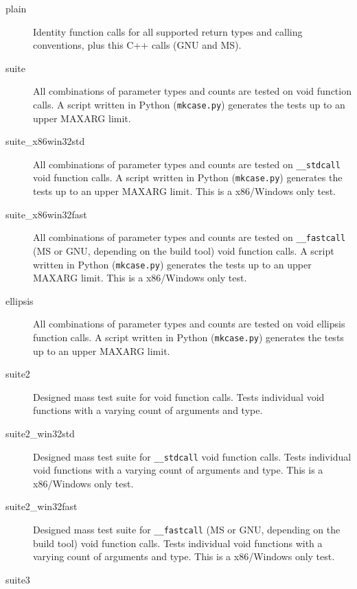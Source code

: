 \begin{description}

\item [plain] 
Identity function calls for all supported return types and calling conventions,
plus this C++ calls (GNU and MS).

\item [suite] 
All combinations of parameter types and counts are tested on void function
calls. A script written in Python ({\tt mkcase.py}) generates the tests up to
an upper MAXARG limit.

\item [suite\_x86win32std] 
All combinations of parameter types and counts are tested on {\tt \_\_stdcall}
void function calls. A script written in Python ({\tt mkcase.py}) generates
the tests up to an upper MAXARG limit. This is a x86/Windows only test.

\item [suite\_x86win32fast] 
All combinations of parameter types and counts are tested on {\tt \_\_fastcall}
(MS or GNU, depending on the build tool) void function calls.
A script written in Python ({\tt mkcase.py}) generates the tests up to
an upper MAXARG limit. This is a x86/Windows only test.

\item [ellipsis]

All combinations of parameter types and counts are tested on void ellipsis 
function calls. A script written in Python ({\tt mkcase.py}) generates the 
tests up to an upper MAXARG limit.

\item [suite2]

Designed mass test suite for void function calls.
Tests individual void functions with a varying count of arguments and type.

\item [suite2\_win32std]

Designed mass test suite for {\tt \_\_stdcall} void function calls.
Tests individual void functions with a varying count of arguments and type.
This is a x86/Windows only test.

\item [suite2\_win32fast]

Designed mass test suite for {\tt \_\_fastcall} (MS or GNU, depending on the build tool) void function calls.
Tests individual void functions with a varying count of arguments and type.
This is a x86/Windows only test.

\item [suite3]


\end{description}
